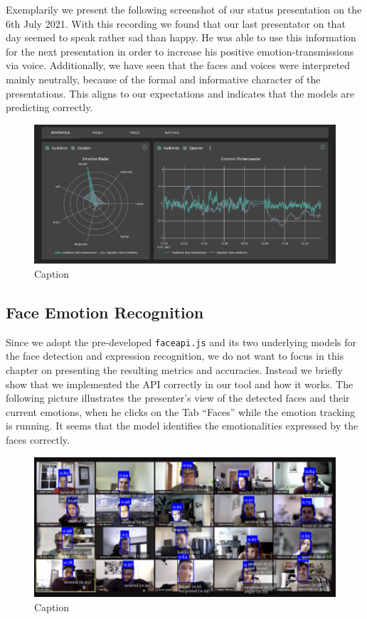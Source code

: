 Exemplarily we present the following screenshot of our status presentation on the 6th July 2021. With this recording we found that our last presentator on that day seemed to speak rather sad than happy. He was able to use this information for the next presentation in order to increase his positive emotion-transmissions via voice. Additionally, we have seen that the faces and voices were interpreted mainly neutrally, because of the formal and informative character of the presentations. This aligns to our expectations and indicates that the models are predicting correctly.

\begin{figure}
\centering
\includegraphics[width=1\textwidth]{assets/moody_statistics_screenshot.png}
\caption{Caption}
\label{fig:moody_statistics_screenshot}
\end{figure}

\subsection{Face Emotion Recognition}
\label{subsec:results_face_emotion_recognition}
Since we adopt the pre-developed \texttt{faceapi.js} and its two underlying models for the face detection and expression recognition, we do not want to focus in this chapter on presenting the resulting metrics and accuracies. Instead we briefly show that we implemented the API correctly in our tool and how it works. The following picture illustrates the presenter's view of the detected faces and their current emotions, when he clicks on the Tab “Faces” while the emotion tracking is running. It seems that the model identifies the emotionalities expressed by the faces correctly.

\begin{figure}
\centering
\includegraphics[width=1\textwidth]{assets/moody_faces_screenshot.png}
\caption{Caption}
\label{fig:moody_faces_screenshot}
\end{figure}

